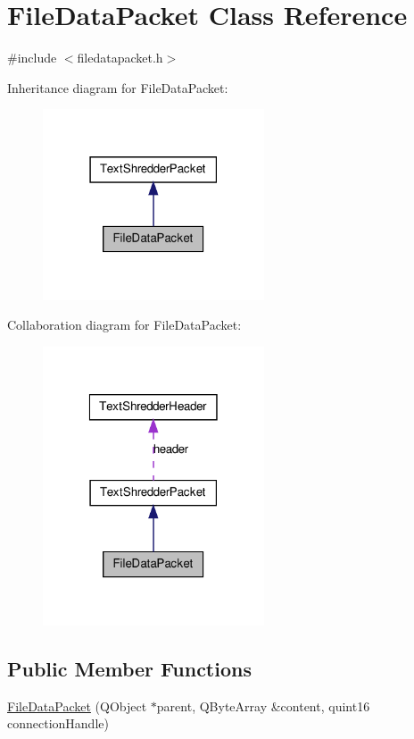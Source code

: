 \hypertarget{class_file_data_packet}{
\section{FileDataPacket Class Reference}
\label{class_file_data_packet}
}


{\ttfamily \#include $<$filedatapacket.h$>$}



Inheritance diagram for FileDataPacket:\nopagebreak
\begin{figure}[H]
\begin{center}
\leavevmode
\includegraphics[width=186pt]{class_file_data_packet__inherit__graph}
\end{center}
\end{figure}


Collaboration diagram for FileDataPacket:\nopagebreak
\begin{figure}[H]
\begin{center}
\leavevmode
\includegraphics[width=186pt]{class_file_data_packet__coll__graph}
\end{center}
\end{figure}
\subsection*{Public Member Functions}
\begin{DoxyCompactItemize}
\item 
\hyperlink{class_file_data_packet_af12461d6909db84d94cb2121d35d50e2}{FileDataPacket} (QObject $\ast$parent, QByteArray \&content, quint16 connectionHandle)
\end{DoxyCompactItemize}

